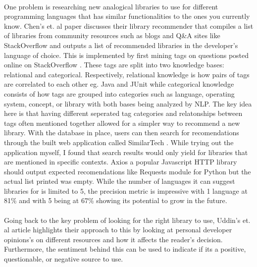 \documentclass[12pt]{article}
\begin{document}
\paragraph{}
One problem is researching new analogical libraries to use for different programming languages that has similar functionalities 
to the ones you currently know. Chen's et. al \cite{analogical} paper discusses their library recommender 
that compiles a list of libraries from community resources such as blogs and Q\&A sites like StackOverflow \cite{stackoverflow} 
and outputs a list of recommended libraries in the developer's language of choice. 
This is implemented by first mining tags on questions posted online on StackOverflow \cite{stackoverflow}.
These tags are split into two knowledge bases: relational and categorical. Respectively, relational knowledge is how pairs of
tags are correlated to each other eg. Java and JUnit while categorical knowledge consists of how tags are grouped into categories such as 
language, operating system, concept, or library with both bases being analyzed by NLP. 
The key idea here is that having different seperated tag categories and relatonships between tags often mentioned together
allowed for a simpler way to recommend a new library. With the database in place, users can then search for recomendations through the built
web application called SimilarTech \cite{similartech}.
While trying out the application myself, I found that search results would only yield for 
libraries that are mentioned in specific contexts.
Axios \cite{axios} a popular Javascript HTTP library should output expected 
recomendations like Requests \cite{requests} module for Python but the actual list printed was empty.
While the number of languages it can suggest libraries for is limited to 5, the precision metric is impressive
with 1 language at 81\% and with 5 being at 67\% showing its potential to grow in the future.

\paragraph{}
Going back to the key problem of looking for the right library to use, Uddin's et. al \cite{opiner} article
highlights their approach to this by looking at personal developer opinions's on different resources
and how it affects the reader's decision. Furthermore, the sentiment behind this can be used to indicate if its 
a positive, questionable, or negative source to use.
\end{document}
